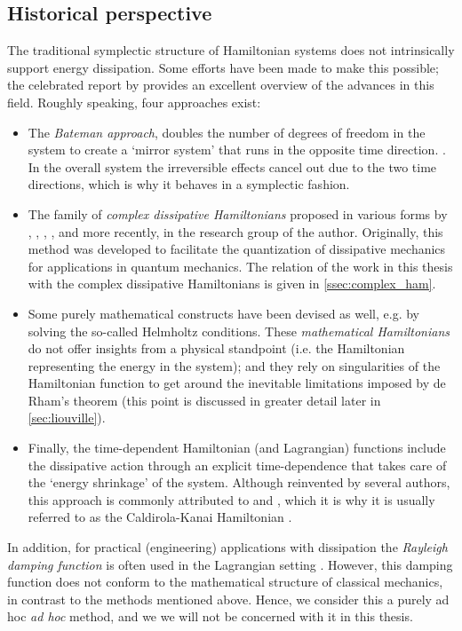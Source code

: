 \subsection{Historical perspective} 
The traditional symplectic structure of Hamiltonian systems does not intrinsically support energy dissipation. Some efforts have been made to make this possible; the celebrated report by \citet{Dekker1981} provides an excellent overview of the advances in this field. Roughly speaking, four approaches exist:
\begin{itemize}
    \item The \emph{Bateman approach}, doubles the number of degrees of freedom in the system to create a `mirror system' that runs in the opposite time direction. \cite{Bateman1931}. In the overall system the irreversible effects cancel out due to the two time directions, which is why it behaves in a symplectic fashion.
    \item The family of \emph{complex dissipative Hamiltonians} proposed in various forms by \citet{Bopp1974}, \citet{Dekker1975}, \citet{Dedene1980}, \citet{Rajeev2007}, and more recently, \citet{Hutters2020} in the research group of the author. Originally, this method was developed to facilitate the quantization of dissipative mechanics for applications in quantum mechanics. The relation of the work in this thesis with the complex dissipative Hamiltonians is given in \cref{ssec:complex_ham}.
    \item Some purely mathematical constructs have been devised as well, e.g. by \citet{Havas1957} solving the so-called Helmholtz conditions. These \emph{mathematical Hamiltonians} do not offer insights from a physical standpoint (i.e. the Hamiltonian representing the energy in the system); and they rely on singularities of the Hamiltonian function to get around the inevitable limitations imposed by de Rham's theorem (this point is discussed in greater detail later in \cref{sec:liouville}).
    \item Finally, the time-dependent Hamiltonian (and Lagrangian) functions include the dissipative action through an explicit time-dependence that takes care of the `energy shrinkage' of the system. Although reinvented by several authors, this approach is commonly attributed to \citet{Caldirola1941} and \citet{Kanai1948}, which it is why it is usually referred to as the Caldirola-Kanai Hamiltonian \cite{Schuch1997,Tokieda2021}.
\end{itemize}
In addition, for practical (engineering) applications with dissipation the \emph{Rayleigh damping function} is often used in the Lagrangian setting \cite{Goldstein2011}. However, this damping function does not conform to the mathematical structure of classical mechanics, in contrast to the methods mentioned above. Hence, we consider this a purely ad hoc \emph{ad hoc} method, and we we will not be concerned with it in this thesis.


